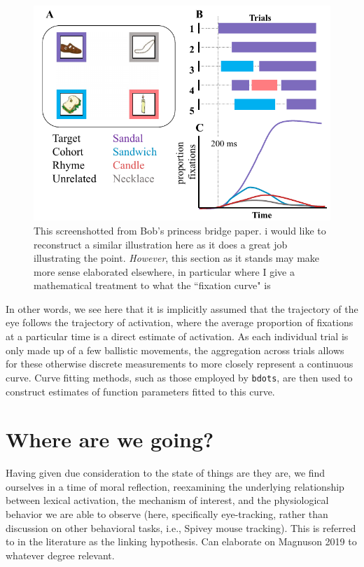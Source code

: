 \documentclass{article}
\newcommand{\xt}{\texttt}%
\begin{document}
\begin{figure}
\centering
\includegraphics[scale=0.45]{bob_vwp_full.png}
\caption{This screenshotted from Bob's princess bridge paper. i would like to reconstruct a similar illustration here as it does a great job illustrating the point. \textit{However}, this section as it stands may make more sense elaborated elsewhere, in particular where I give a mathematical treatment to what the ``fixation curve" is}
\label{fig:bob_diagram_full}
\end{figure}

In other words, we see here that it is implicitly assumed that the trajectory of the eye follows the trajectory of activation, where the average proportion of fixations at a particular time is a direct estimate of activation. As each individual trial is only made up of a few ballistic movements, the aggregation across trials allows for these otherwise discrete measurements to more closely represent a continuous curve. Curve fitting methods, such as those employed by \xt{bdots}, are then used to construct estimates of function parameters fitted to this curve.

\section{Where are we going?} 

Having given due consideration to the state of things are they are, we find ourselves in a time of moral reflection, reexamining the underlying relationship between lexical activation, the mechanism of interest, and the physiological behavior we are able to observe (here, specifically eye-tracking, rather than discussion on other behavioral tasks, i.e., Spivey mouse tracking). This is referred to in the literature as the linking hypothesis. Can elaborate on Magnuson 2019 to whatever degree relevant. 
\end{document}
